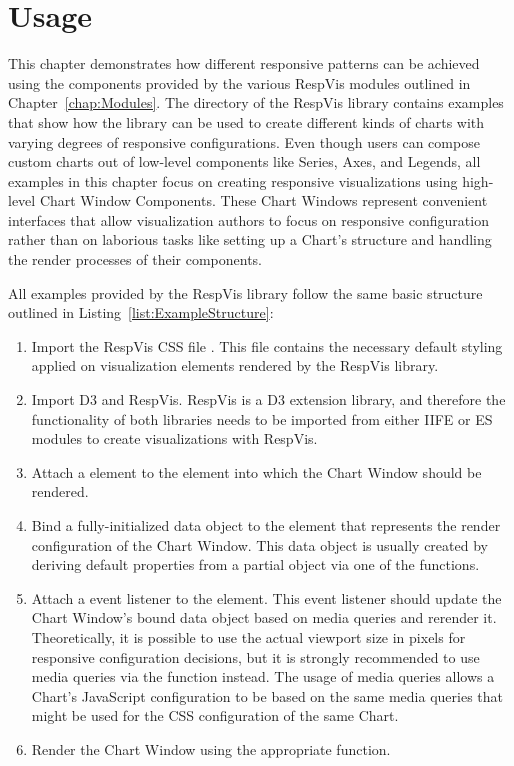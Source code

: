 \chapter{Usage}
\label{chap:Usage}

This chapter demonstrates how different responsive patterns can be achieved using the components provided by the various RespVis modules outlined in Chapter~\ref{chap:Modules}.
The  directory of the RespVis library contains examples that show how the library can be used to create different kinds of charts with varying degrees of responsive configurations.
Even though users can compose custom charts out of low-level components like Series, Axes, and Legends, all examples in this chapter focus on creating responsive visualizations using high-level Chart Window Components.
These Chart Windows represent convenient interfaces that allow visualization authors to focus on responsive configuration rather than on laborious tasks like setting up a Chart's structure and handling the render processes of their components.

All examples provided by the RespVis library follow the same basic structure outlined in Listing~\ref{list:ExampleStructure}:

\begin{enumerate}

\item 
Import the RespVis CSS file .
This file contains the necessary default styling applied on visualization elements rendered by the RespVis library.

\item
Import D3 and RespVis.
RespVis is a D3 extension library, and therefore the functionality of both libraries needs to be imported from either IIFE or ES modules to create visualizations with RespVis.

\item
Attach a  element to the element into which the Chart Window should be rendered.

\item
Bind a fully-initialized data object to the  element that represents the render configuration of the Chart Window.
This data object is usually created by deriving default properties from a partial object via one of the  functions.

\item
Attach a  event listener to the  element.
This event listener should update the Chart Window's bound data object based on media queries and rerender it.
Theoretically, it is possible to use the actual viewport size in pixels for responsive configuration decisions, but it is strongly recommended to use media queries via the  function instead.
The usage of media queries allows a Chart's JavaScript configuration to be based on the same media queries that might be used for the CSS configuration of the same Chart.

\item
Render the Chart Window using the appropriate  function.

\end{enumerate}

